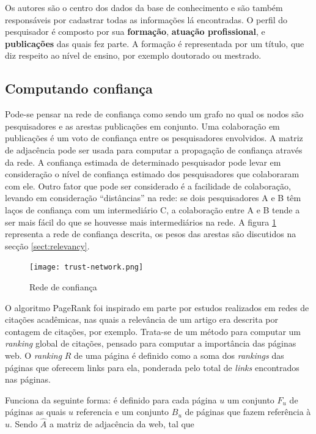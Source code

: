 \documentclass[12pt]{article}
\begin{document}
Os autores são o centro dos dados da base de conhecimento e são também responsáveis por cadastrar todas as informações lá encontradas. 
O perfil do pesquisador é composto por sua \textbf{formação}, \textbf{atuação profissional}, e \textbf{publicações} das quais fez 
parte. A formação é representada por um título, que diz respeito ao nível de ensino, por exemplo doutorado ou mestrado.

\subsection{Computando confiança} \label{sect:computing-trust}

Pode-se pensar na rede de confiança como sendo um grafo no qual os nodos são pesquisadores e as arestas publicações em conjunto. 
Uma colaboração em publicações é um voto de confiança entre os pesquisadores envolvidos. A matriz de adjacência pode ser usada 
para computar a propagação de confiança através da rede. A confiança estimada de determinado pesquisador pode levar em consideração 
o nível de confiança estimado dos pesquisadores que colaboraram com ele. Outro fator que pode ser considerado é a facilidade de 
colaboração, levando em  consideração “distâncias” na rede: se dois pesquisadores A e B têm laços de confiança com um intermediário 
C, a colaboração entre A e B tende a ser mais fácil do que se houvesse mais intermediários na rede. A figura \ref{fig:network} 
representa a rede de confiança descrita, os pesos das arestas são discutidos na secção \ref{sect:relevancy}.

\begin{center}
  \begin{figure}[ht]
    \centering
    \texttt{[image: trust-network.png]}
    \caption{Rede de confiança}
    \label{fig:network}
  \end{figure}
 \end{center}

O algoritmo PageRank \cite{page1999pagerank} foi inspirado em parte por estudos realizados em redes de citações acadêmicas, nas 
quais a relevância de um artigo era descrita por contagem de citações, por exemplo. Trata-se de um método para computar um \textit{ran\-king}  global de citações, pensado para computar a importância das páginas web. O \textit{ranking} $R$ de uma página é definido como a soma dos  \textit{rankings} das páginas que oferecem links para ela, ponderada pelo total de \textit{links} encontrados nas páginas.

Funciona da seguinte forma: é definido para cada página $u$ um conjunto $F_u$ de páginas as quais $u$ referencia e um conjunto $B_u$ de páginas que fazem referência à $u$. Sendo $\hat{A}$ a matriz de adjacência da web, tal que 
\end{document}

